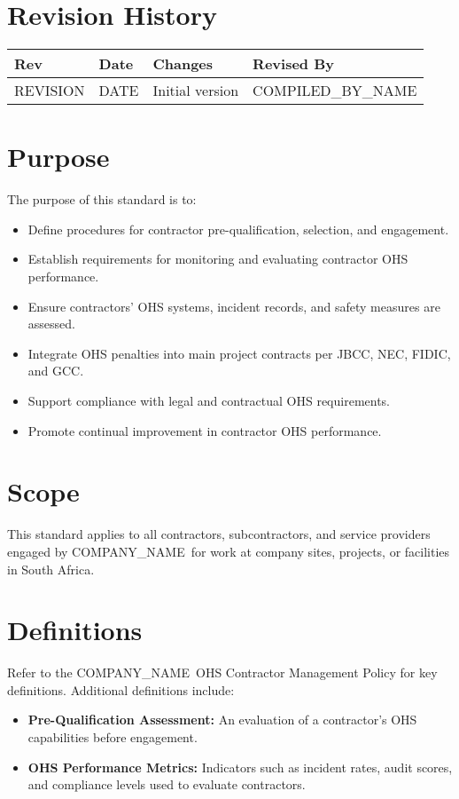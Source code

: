 \documentclass[11pt]{article}
\newcommand{\issueDate}{{{DATE}}}
\newcommand{\clientName}{{{COMPANY_NAME}}}
\newcommand{\compilerName}{{{COMPILED_BY_NAME}}}
\newcommand{\revision}{{{REVISION}}}
\begin{document}
\section{Revision History}
\begin{tabularx}{\textwidth}{lXll}
  \toprule
  \textbf{Rev} & \textbf{Date} & \textbf{Changes} & \textbf{Revised By} \\
  \midrule
  \revision & \issueDate & Initial version & \compilerName \\
  \bottomrule
\end{tabularx}

\section{Purpose}
The purpose of this standard is to:
\begin{itemize}
    \item Define procedures for contractor pre-qualification, selection, and engagement.
    \item Establish requirements for monitoring and evaluating contractor OHS performance.
    \item Ensure contractors’ OHS systems, incident records, and safety measures are assessed.
    \item Integrate OHS penalties into main project contracts per JBCC, NEC, FIDIC, and GCC.
    \item Support compliance with legal and contractual OHS requirements.
    \item Promote continual improvement in contractor OHS performance.
\end{itemize}

\section{Scope}
This standard applies to all contractors, subcontractors, and service providers engaged by \clientName\ for work at company sites, projects, or facilities in South Africa.

\section{Definitions}
Refer to the \clientName\ OHS Contractor Management Policy for key definitions. Additional definitions include:
\begin{itemize}
    \item \textbf{Pre-Qualification Assessment:} An evaluation of a contractor’s OHS capabilities before engagement.
    \item \textbf{OHS Performance Metrics:} Indicators such as incident rates, audit scores, and compliance levels used to evaluate contractors.
\end{itemize}
\end{document}

